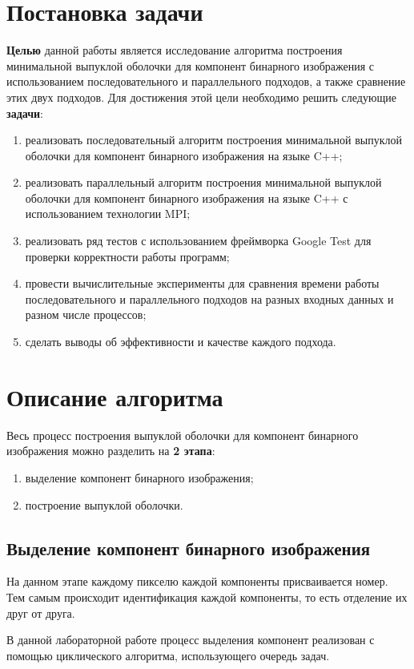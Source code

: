 \documentclass[a4paper, 12pt]{extarticle}
\newcommand{\n}{\par}
\begin{document}
	\section{Постановка задачи}
	\textbf{Целью} данной работы является исследование алгоритма построения минимальной выпуклой оболочки для компонент бинарного изображения с использованием последовательного и параллельного подходов, а также сравнение этих двух подходов. Для достижения этой цели необходимо решить следующие \textbf{задачи}:
	\begin{enumerate}
		\item реализовать последовательный алгоритм построения минимальной выпуклой оболочки для компонент бинарного изображения на языке C++;
		\item реализовать параллельный алгоритм построения минимальной выпуклой оболочки для компонент бинарного изображения на языке C++ с использованием технологии MPI;
		\item реализовать ряд тестов с использованием фреймворка Google Test для проверки корректности работы программ;
		\item провести вычислительные эксперименты для сравнения времени работы последовательного и параллельного подходов на разных входных данных и разном числе процессов;
		\item сделать выводы об эффективности и качестве каждого подхода.
	\end{enumerate}
	\newpage
	\section{Описание алгоритма}
	Весь процесс построения выпуклой оболочки для компонент бинарного изображения можно разделить на \textbf{2 этапа}:
	\begin{enumerate}
		\item выделение компонент бинарного изображения;
		\item построение выпуклой оболочки.
	\end{enumerate}
	\subsection{Выделение компонент бинарного изображения}
	На данном этапе каждому пикселю каждой компоненты присваивается номер. Тем самым происходит идентификация каждой компоненты, то есть отделение их друг от друга.\n
	В данной лабораторной работе процесс выделения компонент реализован с помощью циклического алгоритма, использующего очередь задач.
\end{document}

